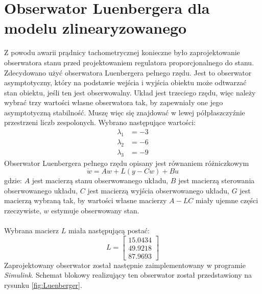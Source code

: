 \documentclass[11pt,a4paper]{article}
\begin{document}
\section{Obserwator Luenbergera dla modelu zlinearyzowanego}
Z powodu awarii prądnicy tachometrycznej konieczne było zaprojektowanie obserwatora stanu przed projektowaniem regulatora proporcjonalnego do stanu. Zdecydowano użyć obserwatora Luenbergera pełnego rzędu. Jest to obserwator asymptotyczny, który na podstawie wejścia i wyjścia obiektu może odtwarzać stan obiektu, jeśli ten jest obserwowalny. Układ jest trzeciego rzędu, więc należy wybrać trzy wartości własne obserwatora tak, by zapewniały one jego asymptotyczną stabilność. Muszę więc się znajdować w lewej półpłaszczyźnie przestrzeni liczb zespolonych. Wybrano następujące wartości:
\begin{equation}
\begin{aligned}
\lambda_1 &= -3\\
\lambda_2 &= -6\\
\lambda_3 &= -9
\end{aligned}
\end{equation}
Obserwator Luenbergera pełnego rzędu opisany jest równaniem różniczkowym
\begin{equation}
\dot w = Aw+L(y-Cw)+Bu
\end{equation}
\noindent gdzie:\newline
\(A\) jest macierzą stanu obserwowanego układu,\newline
\(B\) jest macierzą sterowania obserwowanego układu,\newline
\(C\) jest macierzą wyjścia obserwowanego układu,\newline
\(G\) jest macierzą wybraną tak, by wartości własne macierzy \(A-LC\) miały ujemne części rzeczywiste,\newline
\(w\) estymuje obserwowany stan.
\paragraph*{}
Wybrana macierz \(L\) miała następującą postać:
\begin{equation}
L =
	\begin{bmatrix}
	15.0434\\
	49.9218\\
	87.9693
	\end{bmatrix}
\end{equation}
Zaprojektowany obserwator został następnie zaimplementowany w programie \textit{Simulink}. Schemat blokowy realizujący ten obserwator został przedstawiony na rysunku \ref{fig:Luenberger}.
\end{document}
